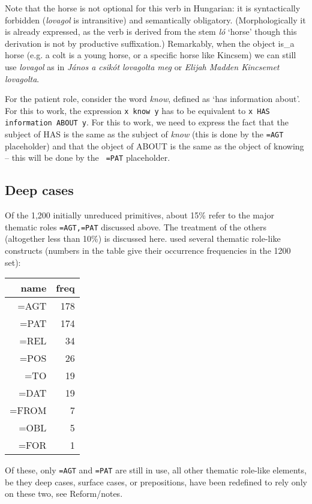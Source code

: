 \documentclass[11pt,bookmarks,bookmarksnumbered,naturalnames,plainpages=false,pdftex,colorlinks=true,urlcolor=blue,bookmarksdepth=subsection,plainpages=false]{paper}
\begin{document}
\noindent
Note that the horse is not optional for this verb in Hungarian: it is
syntactically forbidden ({\it lovagol} is intransitive) and semantically
obligatory. (Morphologically it is already expressed, as the verb is derived
from the stem {\it l\'o} `horse' though this derivation is not by productive
suffixation.) Remarkably, when the object is\_a horse (e.g. a colt is a young
horse, or a specific horse like Kincsem) we can still use {\it lovagol} as in
{\it J\'anos a csik\'ot lovagolta meg} or {\it Elijah Madden Kincsemet
  lovagolta}.

For the patient role, consider the word {\it know}, defined as `has
information about'. For this to work, the expression {\tt x know y} has to be
equivalent to {\tt x HAS information ABOUT y}. For this to work, we need to
express the fact that the subject of HAS is the same as the subject of {\it
  know} (this is done by the {\tt =AGT} placeholder) and that the object of
ABOUT is the same as the object of knowing -- this will be done by the {\tt
  =PAT} placeholder. 

\subsection{Deep cases}\label{deepcase}

Of the 1,200 initially unreduced primitives, about 15\% refer to the major
thematic roles {\tt =AGT,=PAT} discussed above. The treatment of the others
(altogether less than 10\%) is discussed here. \cite{Makrai:2014} used several 
thematic role-like constructs (numbers in the table give their occurrence
frequencies in the 1200 set):

\begin{tabular}{rr}
name & freq\\
\hline
=AGT & 178\\
=PAT & 174\\
=REL & 34\\
=POS & 26\\
=TO & 19\\
=DAT & 19\\
=FROM & 7\\
=OBL & 5\\
=FOR & 1\\
\end{tabular}

Of these, only {\tt =AGT} and {\tt =PAT} are still in use, all other thematic
role-like elements, be they deep cases, surface cases, or prepositions, have
been redefined to rely only on these two, see Reform/notes.
\end{document}
